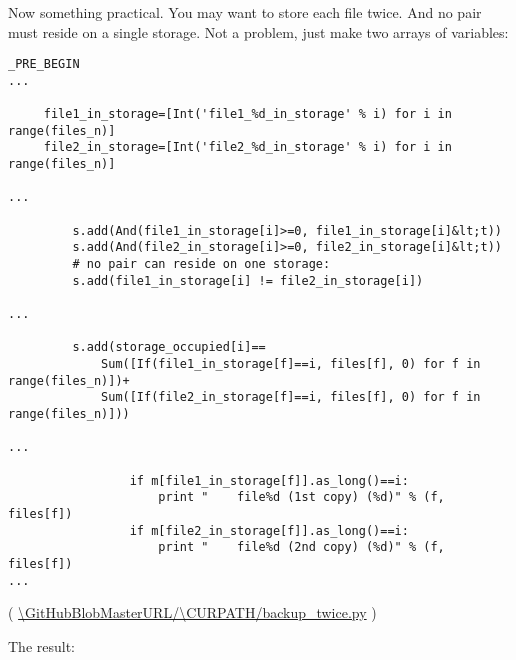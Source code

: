 Now something practical. You may want to store each file twice. And no pair must reside on a single storage.
Not a problem, just make two arrays of variables:

\begin{lstlisting}[style=custompy]
_PRE_BEGIN
...

     file1_in_storage=[Int('file1_%d_in_storage' % i) for i in range(files_n)]
     file2_in_storage=[Int('file2_%d_in_storage' % i) for i in range(files_n)]

...

         s.add(And(file1_in_storage[i]>=0, file1_in_storage[i]&lt;t))
         s.add(And(file2_in_storage[i]>=0, file2_in_storage[i]&lt;t))
         # no pair can reside on one storage:
         s.add(file1_in_storage[i] != file2_in_storage[i])

...

         s.add(storage_occupied[i]==
             Sum([If(file1_in_storage[f]==i, files[f], 0) for f in range(files_n)])+
             Sum([If(file2_in_storage[f]==i, files[f], 0) for f in range(files_n)]))

...

                 if m[file1_in_storage[f]].as_long()==i:
                     print "    file%d (1st copy) (%d)" % (f, files[f])
                 if m[file2_in_storage[f]].as_long()==i:
                     print "    file%d (2nd copy) (%d)" % (f, files[f])
...
\end{lstlisting}

( \url{\GitHubBlobMasterURL/\CURPATH/backup_twice.py} )

The result:

